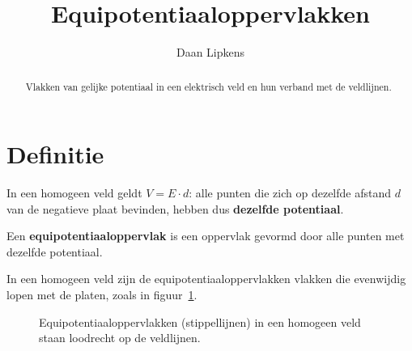 \documentclass{ximera}
\title{Equipotentiaaloppervlakken}
\author{Daan Lipkens}
\begin{document}
\begin{abstract}
    Vlakken van gelijke potentiaal in een elektrisch veld en hun verband met de veldlijnen.
\end{abstract}
\maketitle

\section{Definitie}
In een homogeen veld geldt $V = E \cdot d$: alle punten die zich op dezelfde afstand $d$ van de negatieve plaat bevinden, hebben dus \textbf{dezelfde potentiaal}.

\begin{definition}[foldable=true,title={Equipotentiaaloppervlak}]\nl
Een \textbf{equipotentiaaloppervlak} is een oppervlak gevormd door alle punten met dezelfde potentiaal.
\end{definition}

In een homogeen veld zijn de equipotentiaaloppervlakken vlakken die evenwijdig lopen met de platen, zoals in figuur~\ref{fig:equipotentiaal_homogeen}.

\begin{figure}[h]
    \captionsetup{width=0.85\textwidth}
    \begin{center}
    \end{center}
    \caption{Equipotentiaaloppervlakken (stippellijnen) in een homogeen veld staan loodrecht op de veldlijnen.}
    \label{fig:equipotentiaal_homogeen}
\end{figure}
\end{document}
